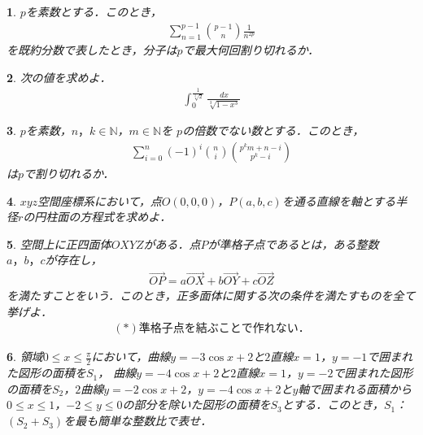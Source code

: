 \documentclass[dvipdfmx]{jsarticle}
\newtheorem{prob}{}[]
\begin{document}
\begin{prob}
   $p$を素数とする．このとき，
\begin{align*}
  \sum_{n=1}^{p-1}\binom{p-1}{n}\frac{1}{n^{2p}} 
\end{align*}
  を既約分数で表したとき，分子は$p$で最大何回割り切れるか． 
\end{prob}
\vfill
\begin{prob}
  次の値を求めよ．
  \begin{align*}
    \int_{0}^{\frac{1}{\sqrt[3]{2} }}  \frac{\,dx }{\sqrt[3]{1-x^3}}
  \end{align*}
\end{prob}
\vfill

\begin{prob}
  $p$を素数，$n，k\in \mathbb{N}$，$m\in \mathbb{N}$を $p$の倍数でない数とする．このとき，
\begin{align*}
  \sum_{i=0}^{n}(-1)^i\binom{n}{i}\binom{p^km+n-i}{p^k-i}
\end{align*}
は$p$で割り切れるか．
\end{prob}
\vfill
\begin{prob}
  $xyz$空間座標系において，点$O(0,0,0)$，$P(a,b,c)$を通る直線を軸とする半径$r$の円柱面の方程式を求めよ．
\end{prob}
\vfill
\begin{prob}
  空間上に正四面体$OXYZ$がある．点$P$が準格子点であるとは，ある整数$a，b，c$が存在し，
\begin{align*}
  \overrightarrow{OP}=a\overrightarrow{OX}+b\overrightarrow{OY}+c\overrightarrow{OZ}  
\end{align*}
を満たすことをいう．このとき，正多面体に関する次の条件を満たすものを全て挙げよ．
\begin{align*}
  (*)準格子点を結ぶことで作れない．
\end{align*}  
\end{prob}
\vfill
\begin{prob}
  領域$0\leq x \leq \frac{\pi}{2}$において，曲線$y=-3\cos x+2$と$2$直線$x=1$，$y=-1$で囲まれた図形の面積を$S_{1}$，
  曲線$y=-4\cos x+2$と$2$直線$x=1$，$y=-2$で囲まれた図形の面積を$S_{2}$，$2$曲線$y=-2\cos x+2$，$y=-4\cos x+2$と$y$軸で囲まれる面積から
  $0\leq x \leq 1$，$-2\leq y\leq 0$の部分を除いた図形の面積を$S_{3}$とする．このとき，$S_{1}$：$\left(S_{2}+S_{3}\right)$を最も簡単な整数比で表せ．
\end{prob}
\vfill
\end{document}
